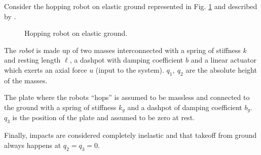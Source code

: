 \begin{exmp}\label{ex:hopping}
    Consider the hopping robot on elastic ground represented in Fig. \ref{fig:hopping} and described by \cite{Ishikawa2003}.
    \begin{figure}[h]
        \centering
        
        \caption[Hopping robot on elastic ground]{Hopping robot on elastic ground. }
        \label{fig:hopping}
    \end{figure}
    The \textit{robot} is made up of two masses interconnected with a spring of stiffness $k$ and resting length $\ell$, a dashpot with damping coefficient $b$ and a linear actuator which exerts an axial force $u$ (input to the system). 
    $q_1,~q_2$ are the absolute height of the masses.
    
    The plate where the robots ``hops'' is assumed to be massless and connected to the ground with a spring of stiffness $k_g$ and a dashpot of damping coefficient $b_g$.
    $q_3$ is the position of the plate and assumed to be zero at rest.
    
    Finally, impacts are considered completely inelastic and that takeoff from ground always happens at $q_2 = q_3 = 0$.
    

\end{exmp}
